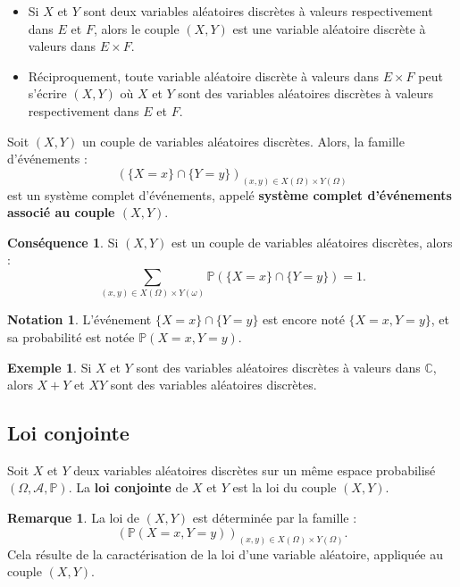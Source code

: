 \documentclass[french]{article}
\renewcommand{\P}{\mathbb{P}}
\newcommand{\C}{\mathbb{C}}
\theoremstyle{plain}
\theoremstyle{definition}
\newtheorem*{ex}{Exemple}
\newtheorem*{rmq}{Remarque}
\newtheorem*{notation}{Notation}
\newtheorem*{conséquence}{Conséquence}
\theoremstyle{remark}
\begin{document}
\begin{thm}{}%
	\begin{itemize}
		\item Si $X$ et $Y$ sont deux variables aléatoires discrètes à valeurs respectivement dans $E$ et $F$, alors le couple $(X,Y)$ est une variable aléatoire discrète à valeurs dans $E\times F$.
		\item Réciproquement, toute variable aléatoire discrète à valeurs dans $E\times F$ peut s'écrire $(X,Y)$ où $X$ et $Y$ sont des variables aléatoires discrètes à valeurs respectivement dans $E$ et $F$.
	\end{itemize}
\end{thm}

\begin{thm}{}%
	Soit $(X,Y)$ un couple de variables aléatoires discrètes. Alors, la famille d'événements :
	$$(\{X=x\}\cap\{Y=y\})_{(x,y)\in X(\Omega)\times Y(\Omega)}$$ est un système complet d'événements, appelé \textbf{système complet d'événements associé au couple $(X,Y)$}.
\end{thm}

\begin{conséquence}
	Si $(X,Y)$ est un couple de variables aléatoires discrètes, alors :
	$$\sum_{(x,y)\in X(\Omega)\times Y(\omega)}\P(\{X=x\}\cap\{Y=y\})=1.$$
\end{conséquence}

\begin{notation}
	L'événement $\{X=x\}\cap\{Y=y\}$ est encore noté $\{X=x,Y=y\}$, et sa probabilité est notée $\P(X=x,Y=y)$.
\end{notation}

\begin{ex}
	Si $X$ et $Y$ sont des variables aléatoires discrètes à valeurs dans $\C$, alors $X+Y$ et $XY$ sont des variables aléatoires discrètes. %
\end{ex}

\subsection{Loi conjointe}

\begin{dfn}
	Soit $X$ et $Y$ deux variables aléatoires discrètes sur un même espace probabilisé $(\Omega,\mathcal{A},\P)$. La \textbf{loi conjointe} de $X$ et $Y$ est la loi du couple $(X,Y)$.
\end{dfn}

\begin{rmq}
	La loi de $(X,Y)$ est déterminée par la famille :
	$$(\P(X=x,Y=y))_{(x,y)\in X(\Omega)\times Y(\Omega)}.$$
	Cela résulte de la caractérisation de la loi d'une variable aléatoire, appliquée au couple $(X,Y)$.
\end{rmq}
\end{document}

